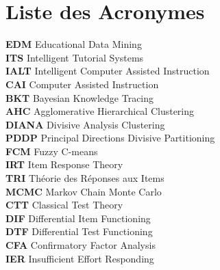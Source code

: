 \chapter*{Liste des Acronymes }
\textbf{EDM}\hspace{0.5cm}  Educational Data Mining\\
\textbf{ITS}\hspace{0.5cm}  Intelligent Tutorial Systems\\
\textbf{IALT}\hspace{0.5cm}  Intelligent Computer Assisted Instruction\\
\textbf{CAI}\hspace{0.5cm}  Computer Assisted Instruction\\
\textbf{BKT}\hspace{0.5cm}  Bayesian Knowledge Tracing\\
\textbf{AHC}\hspace{0.5cm}  Agglomerative Hierarchical Clustering\\
\textbf{DIANA  }\hspace{0.5cm}  Divisive Analysis Clustering\\
\textbf{PDDP}\hspace{0.5cm}  Principal Directions Divisive Partitioning\\
\textbf{FCM}\hspace{0.5cm}  Fuzzy C-means\\
\textbf{IRT}\hspace{0.5cm}  Item Response Theory\\
\textbf{TRI}\hspace{0.5cm}  Théorie des Réponses aux Items\\
\textbf{MCMC}\hspace{0.5cm}  Markov Chain Monte Carlo\\
\textbf{CTT}\hspace{0.5cm}  Classical Test Theory\\
\textbf{DIF}\hspace{0.5cm}  Differential Item Functioning\\
\textbf{DTF}\hspace{0.5cm}  Differential Test Functioning\\
\textbf{CFA}\hspace{0.5cm}  Confirmatory Factor Analysis\\
\textbf{IER}\hspace{0.5cm}  Insufficient Effort Responding\\
